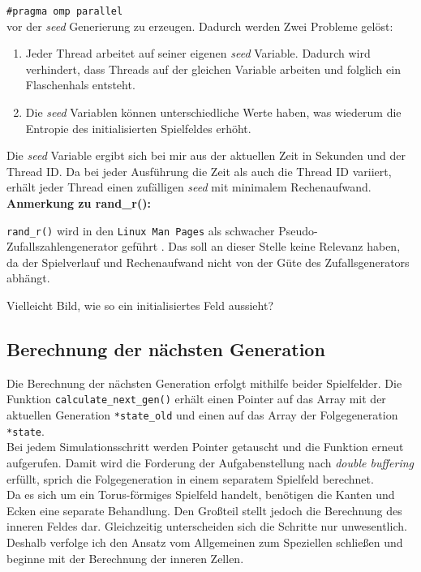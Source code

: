 \documentclass[german,plainarticle,hyperref,utf8]{zihpub}
\begin{document}
	\texttt{\#pragma omp parallel}\\
	
	vor der \textit{seed} Generierung zu erzeugen. Dadurch werden Zwei Probleme gelöst:
	\begin{enumerate}
	\item Jeder Thread arbeitet auf seiner eigenen \textit{seed} Variable. Dadurch wird verhindert, dass Threads auf der gleichen Variable arbeiten und folglich ein Flaschenhals entsteht.
	\item Die \textit{seed} Variablen können unterschiedliche Werte haben, was wiederum die Entropie des initialisierten Spielfeldes erhöht.
	\end{enumerate}
	
	Die \textit{seed} Variable ergibt sich bei mir aus der aktuellen Zeit in Sekunden und der Thread ID. Da bei jeder Ausführung die Zeit als auch die Thread ID variiert, erhält jeder Thread einen zufälligen \textit{seed} mit minimalem Rechenaufwand.\\
	
	\textbf{Anmerkung zu rand\_r():}
	
	\texttt{rand\_r()} wird in den \texttt{Linux Man Pages} als schwacher Pseudo-Zufallszahlengenerator geführt \cite{lmp}. Das soll an dieser Stelle keine Relevanz haben, da der Spielverlauf und Rechenaufwand nicht von der Güte des Zufallsgenerators abhängt.
	
	Vielleicht Bild, wie so ein initialisiertes Feld aussieht?
	
	\subsection{Berechnung der nächsten Generation}
	Die Berechnung der nächsten Generation erfolgt mithilfe beider Spielfelder. Die Funktion \texttt{calculate\_next\_gen()} erhält einen Pointer auf das Array mit der aktuellen Generation \texttt{*state\_old} und einen auf das Array der Folgegeneration \texttt{*state}.\\
	Bei jedem Simulationsschritt werden Pointer getauscht und die Funktion erneut aufgerufen. Damit wird die Forderung der Aufgabenstellung nach \textit{double buffering} erfüllt, sprich die Folgegeneration in einem separatem Spielfeld berechnet.\\
	Da es sich um ein Torus-förmiges Spielfeld handelt, benötigen die Kanten und Ecken eine separate Behandlung. Den Großteil stellt jedoch die Berechnung des inneren Feldes dar. Gleichzeitig unterscheiden sich die Schritte nur unwesentlich. Deshalb verfolge ich den Ansatz vom Allgemeinen zum Speziellen schließen und beginne mit der Berechnung der inneren Zellen.\\
	
\end{document}
